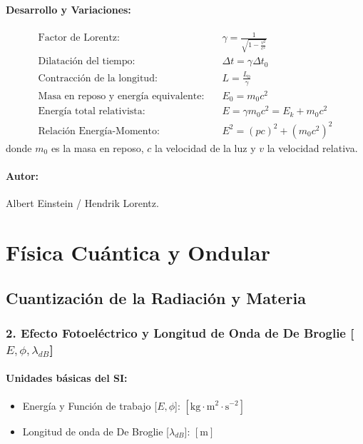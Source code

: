 \documentclass[12pt,a4paper]{article}
\begin{document}
\paragraph*{Desarrollo y Variaciones:}
\begin{align*}
\text{Factor de Lorentz:} \quad & \gamma = \frac{1}{\sqrt{1 - \frac{v^2}{c^2}}} \\
\text{Dilatación del tiempo:} \quad & \Delta t = \gamma \Delta t_0 \\
\text{Contracción de la longitud:} \quad & L = \frac{L_0}{\gamma} \\
\text{Masa en reposo y energía equivalente:} \quad & E_0 = m_0 c^2 \\
\text{Energía total relativista:} \quad & E = \gamma m_0 c^2 = E_k + m_0 c^2 \\
\text{Relación Energía-Momento:} \quad & E^2 = (p c)^2 + (m_0 c^2)^2
\end{align*}
donde $m_0$ es la masa en reposo, $c$ la velocidad de la luz y $v$ la velocidad relativa.
\paragraph*{Autor:} Albert Einstein / Hendrik Lorentz.

\section{Física Cuántica y Ondular}

\subsection{Cuantización de la Radiación y Materia}

\subsubsection*{2. Efecto Fotoeléctrico y Longitud de Onda de De Broglie [$E, \phi, \lambda_{dB}$]}
\paragraph*{Unidades básicas del SI:}
\begin{itemize}
    \item Energía y Función de trabajo [$E, \phi$]: $[\text{kg}\cdot\text{m}^2\cdot\text{s}^{-2}]$
    \item Longitud de onda de De Broglie [$\lambda_{dB}$]: $[\text{m}]$
\end{itemize}
\end{document}
